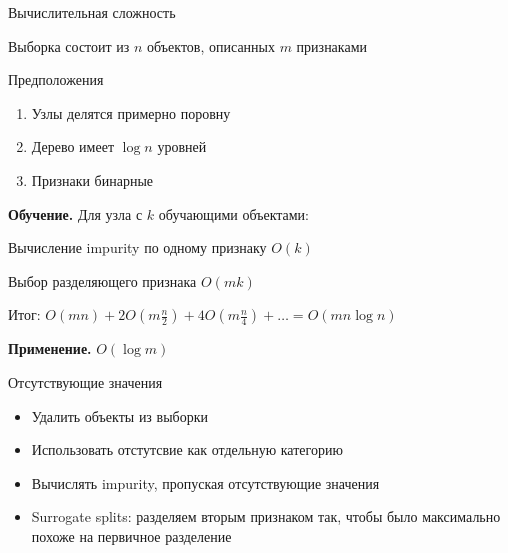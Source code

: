 \documentclass[aspectratio=169]{beamer}
\begin{document}
\begin{frame}{Вычислительная сложность}

Выборка состоит из $n$ объектов, описанных $m$ признаками

\vspace{1em}
Предположения
\begin{enumerate}
\item Узлы делятся примерно поровну
\item Дерево имеет $\log n$ уровней
\item Признаки бинарные
\end{enumerate}

\vspace{1em}
{\bf Обучение. } Для узла с $k$ обучающими объектами:

\vspace{1em}
\hspace{1em}Вычисление impurity по одному признаку $O(k)$

\hspace{1em}Выбор разделяющего признака $O(mk)$ 

\hspace{1em}Итог: $O(mn) + 2 O(m \frac{n}{2}) + 4 O(m \frac{n}{4}) + \ldots = O(m n \log n)$

\vspace{1em}
{\bf Применение. } $O(\log m)$

\end{frame}

\begin{frame}{Отсутствующие значения}

\begin{itemize}
\item Удалить объекты из выборки
\item Использовать отстутсвие как отдельную категорию
\item Вычислять impurity, пропуская отсутствующие значения
\item Surrogate splits: разделяем вторым признаком так, чтобы было максимально похоже на первичное разделение
\end{itemize}

\end{frame}
\end{document}

